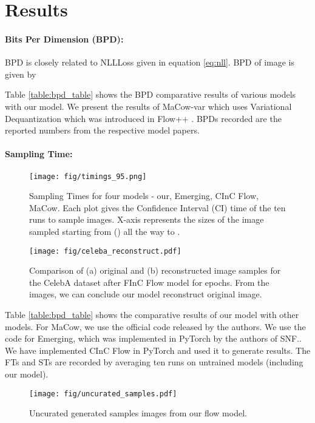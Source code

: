 \documentclass[a4paper,twoside]{article}
\theoremstyle{definition}
\begin{document}
\section{Results}\label{sec:results}
\paragraph{Bits Per Dimension (BPD):}
BPD is closely related to NLLLoss given in equation \ref{eq:nll}. BPD of  image is given by

Table \ref{table:bpd_table} shows the BPD comparative results of various models with our model. We present the results of MaCow-var which uses Variational Dequantization which was introduced in Flow++ \citep{ho2019flow++}. BPDs recorded are the reported numbers from the respective model papers.

\paragraph{Sampling Time:}\label{section:SamplingTimes}
\begin{figure*}[!ht]
    \centering
    \texttt{[image: fig/timings\_95.png]}
    \caption{Sampling Times for four models - our, Emerging, CInC Flow,  MaCow. Each plot gives the  Confidence Interval (CI) time of the ten runs to sample  images. X-axis represents the sizes of the image sampled starting from  () all the way to . }
    \label{fig:timing}
\end{figure*}



\begin{figure*}[!ht]
    \centering
    \texttt{[image: fig/celeba\_reconstruct.pdf]}
    \caption{Comparison of  (a) original and (b) reconstructed image samples for the  CelebA dataset after FInC Flow model for  epochs. From the images, we can conclude our model reconstruct original image.}
    \label{fig:celeba_reconstruct}
\end{figure*}
Table \ref{table:bpd_table} shows the comparative results of our model with other models. For MaCow, we use the official code released by the authors. We use the code for Emerging, which was implemented in PyTorch by the authors of SNF.. We have implemented CInC Flow in PyTorch and used it to generate results.
The FTs and STs are recorded by averaging ten runs on untrained models (including our model). 


\begin{figure}[!ht]
    \centering
    \texttt{[image: fig/uncurated\_samples.pdf]}
    \caption{Uncurated generated samples images from our flow model.}
    \label{fig:uncurated_samples}
\end{figure}
\end{document}
